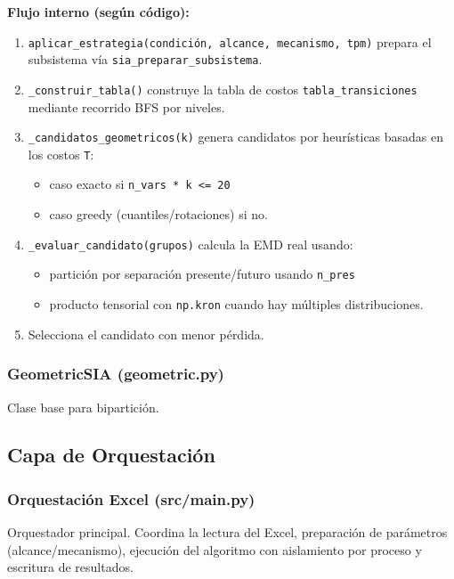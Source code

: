 \documentclass[12pt,a4paper]{article}
\begin{document}
\textbf{Flujo interno (según código):}
\begin{enumerate}
    \item \texttt{aplicar\_estrategia(condición, alcance, mecanismo, tpm)}\; prepara el subsistema vía \texttt{sia\_preparar\_subsistema}.
    \item \texttt{_construir\_tabla()}\; construye la tabla de costos \texttt{tabla\_transiciones} mediante recorrido BFS por niveles.
    \item \texttt{_candidatos\_geometricos(k)}\; genera candidatos por heurísticas basadas en los costos \texttt{T}:
    \begin{itemize}
        \item caso exacto si \texttt{n\_vars * k <= 20}
        \item caso greedy (cuantiles/rotaciones) si no.
    \end{itemize}
    \item \texttt{_evaluar\_candidato(grupos)}\; calcula la EMD real usando:
    \begin{itemize}
        \item partición por separación presente/futuro usando \texttt{n\_pres}
        \item producto tensorial con \texttt{np.kron} cuando hay múltiples distribuciones.
    \end{itemize}
    \item Selecciona el candidato con menor pérdida.
\end{enumerate}

\subsubsection{GeometricSIA (geometric.py)}
Clase base para bipartición.

\subsection{Capa de Orquestación}

\subsubsection{Orquestación Excel (src/main.py)}
Orquestador principal. Coordina la lectura del Excel, preparación de parámetros (alcance/mecanismo), ejecución del algoritmo con aislamiento por proceso y escritura de resultados.
\end{document}
